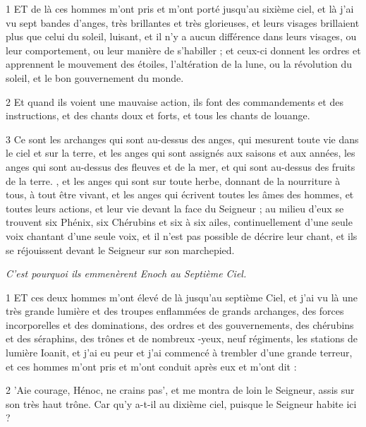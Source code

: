 \par 1 ET de là ces hommes m'ont pris et m'ont porté jusqu'au sixième ciel, et là j'ai vu sept bandes d'anges, très brillantes et très glorieuses, et leurs visages brillaient plus que celui du soleil, luisant, et il n'y a aucun différence dans leurs visages, ou leur comportement, ou leur manière de s'habiller ; et ceux-ci donnent les ordres et apprennent le mouvement des étoiles, l'altération de la lune, ou la révolution du soleil, et le bon gouvernement du monde.

\par 2 Et quand ils voient une mauvaise action, ils font des commandements et des instructions, et des chants doux et forts, et tous les chants de louange.

\par 3 Ce sont les archanges qui sont au-dessus des anges, qui mesurent toute vie dans le ciel et sur la terre, et les anges qui sont assignés aux saisons et aux années, les anges qui sont au-dessus des fleuves et de la mer, et qui sont au-dessus des fruits de la terre. , et les anges qui sont sur toute herbe, donnant de la nourriture à tous, à tout être vivant, et les anges qui écrivent toutes les âmes des hommes, et toutes leurs actions, et leur vie devant la face du Seigneur ; au milieu d'eux se trouvent six Phénix, six Chérubins et six à six ailes, continuellement d'une seule voix chantant d'une seule voix, et il n'est pas possible de décrire leur chant, et ils se réjouissent devant le Seigneur sur son marchepied.


\par \textit{C'est pourquoi ils emmenèrent Enoch au Septième Ciel.}

\par 1 ET ces deux hommes m'ont élevé de là jusqu'au septième Ciel, et j'ai vu là une très grande lumière et des troupes enflammées de grands archanges, des forces incorporelles et des dominations, des ordres et des gouvernements, des chérubins et des séraphins, des trônes et de nombreux -yeux, neuf régiments, les stations de lumière Ioanit, et j'ai eu peur et j'ai commencé à trembler d'une grande terreur, et ces hommes m'ont pris et m'ont conduit après eux et m'ont dit :

\par 2 'Aie courage, Hénoc, ne crains pas', et me montra de loin le Seigneur, assis sur son très haut trône. Car qu’y a-t-il au dixième ciel, puisque le Seigneur habite ici ?

